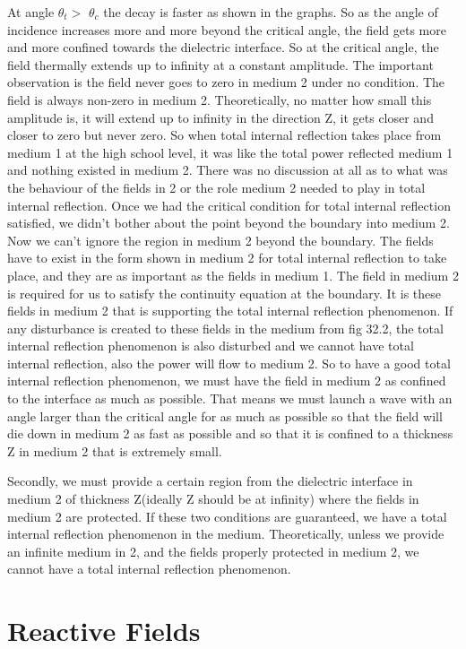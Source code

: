 At angle $\theta_t >$ $\theta_c$ the decay is faster as shown in the graphs. 
So as the angle of incidence increases more and more beyond the critical angle, the field gets more and more confined towards the dielectric interface. So at the critical angle, the field thermally extends up to infinity at a constant amplitude. The important observation is the field never goes to zero in medium 2 under no condition. The field is always non-zero in medium 2. Theoretically, no matter how small this amplitude is, it will extend up to infinity in the direction Z, it gets closer and closer to zero but never zero.
So when total internal reflection takes place from medium 1 at the high school level, it was like the total power reflected medium 1 and nothing existed in medium 2. There was no discussion at all as to what was the behaviour of the fields in 2 or the role medium 2 needed to play in total internal reflection. Once we had the critical condition for total internal reflection satisfied, we didn't bother about the point beyond the boundary into medium 2. Now we can't ignore the region in medium 2 beyond the boundary. The fields have to exist in the form shown in medium 2 for total internal reflection to take place, and they are as important as the fields in medium 1. The field in medium 2 is required for us to satisfy the continuity equation at the boundary. It is these fields in medium 2 that is supporting the total internal reflection phenomenon. If any disturbance is created to these fields in the medium from fig 32.2, the total internal reflection phenomenon is also disturbed and we cannot have total internal reflection, also the power will flow to medium 2. So to have a good total internal reflection phenomenon, we must have the field in medium 2 as confined to the interface as much as possible. That means we must launch a wave with an angle larger than the critical angle for as much as possible so that the field will die down in medium 2 as fast as possible and so that it is confined to a thickness Z in medium 2 that is extremely small.

Secondly, we must provide a certain region from the dielectric interface in medium 2 of thickness Z(ideally Z should be at infinity) where the fields in medium 2 are protected. If these two conditions are guaranteed, we have a total internal reflection phenomenon in the medium. Theoretically, unless we provide an infinite medium in 2, and the fields properly protected in medium 2, we cannot have a total internal reflection phenomenon.

\section{Reactive Fields}

